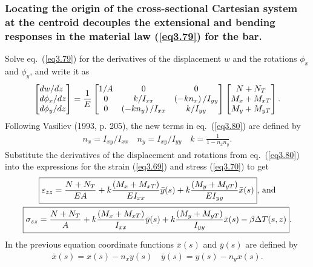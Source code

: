 \documentclass{AeroStructure-ERJohnson}
\begin{document}
\subsubsection{{Locating the origin of the cross-sectional Cartesian system at the centroid decouples the extensional and bending responses in the material law (\ref{eq3.79}) for the bar.}} Solve eq.~(\ref{eq3.79}) for the derivatives of the displacement $w$ and the rotations $\phi_{x}$ and $\phi_{y}$, and write it as
\begin{align}\label{eq3.80}
\left[\begin{array}{@{}l@{}}d w / d z \\d \phi_{x} / d z \\d \phi_{y} / d z\end{array}\right]=\frac{1}{E}\left[\begin{array}{@{}ccc@{}}1 / A & 0 & 0 \\0 & k / I_{x x} & \left(-k n_{x}\right) / I_{y y} \\0 & \left(-k n_{y}\right) / I_{x x} & k / I_{y y}\end{array}\right]\left[\begin{array}{@{}c@{}}N+N_{T} \\M_{x}+M_{x T} \\M_{y}+M_{y T}\end{array}\right].
\end{align}
Following Vasiliev (1993, p. 205), the new terms in eq.~(\ref{eq3.80}) are defined by
\begin{align}\label{eq3.81}
n_{x}=I_{x y} / I_{x x} \quad n_{y}=I_{x y} / I_{y y} \quad k=\frac{1}{1-n_{x} n_{y}}.
\end{align}
Substitute the derivatives of the displacement and rotations from eq.~(\ref{eq3.80}) into the expressions for the strain (\ref{eq3.69}) and stress (\ref{eq3.70}) to get
\begin{gather}
\fbox{$\displaystyle\varepsilon_{z z}=\frac{N+N_{T}}{E A}+k \frac{\left(M_{x}+M_{x T}\right)}{E I_{x x}} \bar{y}(s)+k \frac{\left(M_{y}+M_{y T}\right)}{E I_{y y}} \bar{x}(s)$}\mbox{, and}\label{eq3.82}\\
\fbox{$\displaystyle\sigma_{z z}=\frac{N+N_{T}}{A}+k \frac{\left(M_{x}+M_{x T}\right)}{I_{x x}} \bar{y}(s)+k \frac{\left(M_{y}+M_{y T}\right)}{I_{y y}} \bar{x}(s)-\beta \Delta T(s, z)$}.\label{eq3.83}
\end{gather}
In the previous equation coordinate functions $\bar{x}(s)$ and $\bar{y}(s)$ are defined by
\begin{align}\label{eq3.84}
\bar{x}(s)=x(s)-n_{x} y(s) \quad \bar{y}(s)=y(s)-n_{y} x(s).
\end{align}
\end{document}
